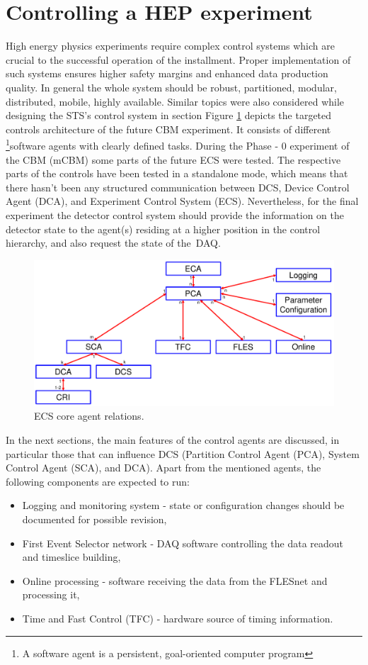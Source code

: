 \section{Controlling a HEP experiment}

High energy physics experiments require complex control systems which are crucial to the successful operation of the installment. Proper implementation of such systems ensures higher safety margins and enhanced data production quality. In general the whole system should be robust, partitioned, modular, distributed, mobile, highly available. Similar topics were also considered while designing the \gls{STS}'s control system in section 
Figure \ref{fig_sim} depicts the targeted controls architecture of the future \gls{CBM} experiment. It consists of different \footnote{A software agent is a persistent, goal-oriented computer program}{software agents} with clearly defined tasks. During the Phase - 0 experiment of the \gls{CBM} (\gls{mCBM}) some parts of the future \gls{ECS} were tested. The respective parts of the controls have been tested in a standalone mode, which means that there hasn't been any structured communication between \gls{DCS}, Device Control Agent (\gls{DCA}), and Experiment Control System (\gls{ECS}). Nevertheless, for the final experiment the detector control system should provide the information on the detector state to the agent(s) residing at a higher position in the control hierarchy, and also request the state of the~\gls{DAQ}.

\newpage
\begin{figure}[!h]
\centering
\includegraphics[width=0.8\columnwidth]{Chapter3/Controls/images/AgentsRelations_V2.pdf}
\caption{\gls{ECS} core agent relations.}
\label{fig_sim}
\end{figure}

 In the next sections, the main features of the control agents are discussed, in particular those that can influence \gls{DCS} (Partition Control Agent (\gls{PCA}), System Control Agent (\gls{SCA}), and \gls{DCA}). Apart from the mentioned agents, the following components are expected to run: 
 \begin{itemize}
     \item Logging and monitoring system - state or configuration changes should be documented for possible revision,
     \item First Event Selector network - \gls{DAQ} software controlling the data readout and timeslice building,
     \item Online processing - software receiving the data from the FLESnet and processing it,
     \item Time and Fast Control (\gls{TFC}) - hardware source of timing information.
 \end{itemize}
